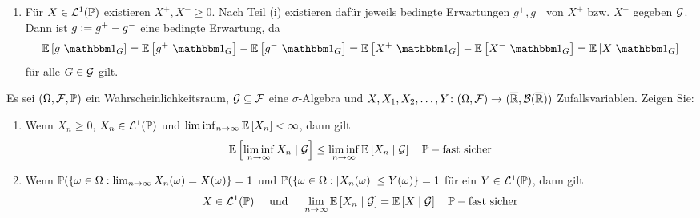 \begin{exercisePage}
\begin{enumerate}[leftmargin=*, label=(zu \alph*)]
\begin{enumerate}[wide, leftmargin=*, label=(\roman*), nolistsep]
			\item Für $X \in \mathcal{L}^1(\mathbb{P})$ existieren $X^+, X^- \ge 0$. Nach Teil (i) existieren dafür jeweils bedingte Erwartungen $g^+ , g^-$ von $X^+$ bzw. $X^-$ gegeben $\mathcal{G}$. Dann ist $g \mathrel{:=} g^+ - g^- $ eine bedingte Erwartung, da
			\begin{equation*}
				\EW[g \ \one_G] = \EW[g^+ \ \one_G] - \EW[g^- \ \one_G] = \EW[X^+ \ \one_G] - \EW[X^- \ \one_G] = \EW[X \ \one_G]
			\end{equation*}
			für alle $G \in \mathcal{G}$ gilt.
		\end{enumerate}
	\end{enumerate}

	\begin{homework}
		Es sei $(\Omega, \mathcal{F}, \mathbb{P})$ ein Wahrscheinlichkeitsraum, $\mathcal{G} \subseteq \mathcal{F}$ eine $\sigma$-Algebra und $\abb{X,X_1, X_2, \dots , Y}{(\Omega, \ereignisF)}{(\quer{\R},\borel{\quer{\R}})}$ Zufallsvariablen. Zeigen Sie:
		\begin{enumerate}[leftmargin=*, nolistsep]
			\item Wenn $X_n \ge 0$, $X_n \in \mathcal{L}^1(\mathbb{P})$ und $\liminf_{n \to \infty} \mathbb{E} \left[ X_n \right] < \infty$, dann gilt
			\begin{equation*}
				\mathbb{E} \left[ \liminf_{n \to \infty} X_n \mid \mathcal{G} \right] \le \liminf_{n \to \infty} \mathbb{E} \left[ X_n \mid \mathcal{G} \right] \quad \mathbb{P}-\text{fast sicher}
			\end{equation*}
			\item Wenn $\mathbb{P}(\left\{ \omega \in \Omega : \lim_{n \to \infty} X_n(\omega) = X(\omega) \right\} =  1$ und $\mathbb{P}(\left\{ \omega \in \Omega : \left| X_n(\omega) \right| \le Y(\omega) \right\} =  1$ für ein $Y \in \mathcal{L}^1(\mathbb{P})$, dann gilt 
			\begin{equation*}
				X \in \mathcal{L}^1(\mathbb{P}) \quad \text{ und } \quad
				\lim_{n \to \infty} \mathbb{E} \left[ X_n \mid \mathcal{G} \right] = \mathbb{E} \left[ X \mid \mathcal{G} \right] \quad \mathbb{P}-\text{fast sicher}
			\end{equation*}
		\end{enumerate}
	\end{homework}


\end{exercisePage}
